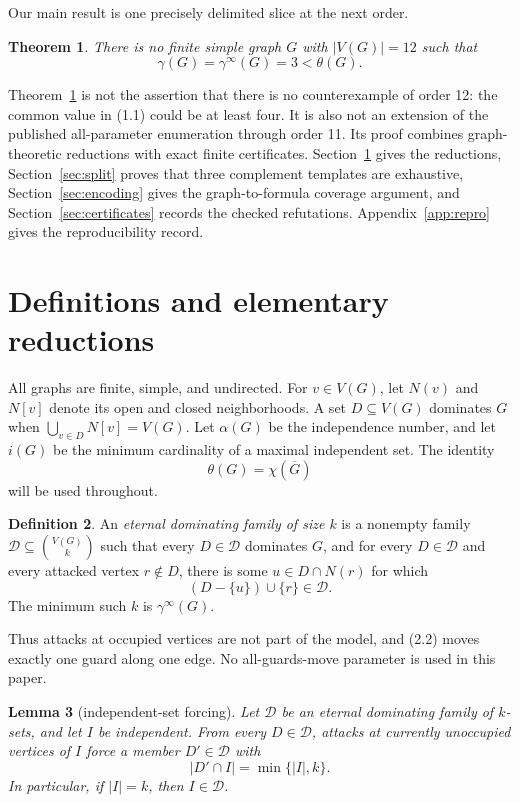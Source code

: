\documentclass[11pt]{article}
\newtheorem{theorem}{Theorem}[section]
\newtheorem{lemma}[theorem]{Lemma}
\theoremstyle{definition}
\newtheorem{definition}[theorem]{Definition}
\theoremstyle{remark}
\newcommand{\gaminf}{\gamma^{\infty}}
\newcommand{\V}{V}
\begin{document}
Our main result is one precisely delimited slice at the next order.

\begin{theorem}\label{thm:main}
There is no finite simple graph \(G\) with \(|\V(G)|=12\) such that
\[
  \gamma(G)=\gaminf(G)=3<\theta(G).
\]
\end{theorem}

Theorem~\ref{thm:main} is not the assertion that there is no counterexample
of order 12: the common value in (1.1) could be at least four.  It is also
not an extension of the published all-parameter enumeration through order
11.  Its proof combines graph-theoretic reductions with exact finite
certificates.  Section~\ref{sec:reductions} gives the reductions,
Section~\ref{sec:split} proves that three complement templates are
exhaustive, Section~\ref{sec:encoding} gives the graph-to-formula coverage
argument, and Section~\ref{sec:certificates} records the checked
refutations.  Appendix~\ref{app:repro} gives the reproducibility record.

\section{Definitions and elementary reductions}\label{sec:reductions}

All graphs are finite, simple, and undirected.  For \(v\in\V(G)\), let
\(N(v)\) and \(N[v]\) denote its open and closed neighborhoods.  A set
\(D\subseteq\V(G)\) dominates \(G\) when
\(\bigcup_{v\in D}N[v]=\V(G)\).  Let \(\alpha(G)\) be the independence
number, and let \(i(G)\) be the minimum cardinality of a maximal independent
set.  The identity
\[
  \theta(G)=\chi(\overline G)
\tag{2.1}
\]
will be used throughout.

\begin{definition}
An \emph{eternal dominating family of size \(k\)} is a nonempty family
\(\mathcal D\subseteq\binom{\V(G)}k\) such that every
\(D\in\mathcal D\) dominates \(G\), and for every \(D\in\mathcal D\) and
every attacked vertex \(r\notin D\), there is some
\(u\in D\cap N(r)\) for which
\[
  (D-\{u\})\cup\{r\}\in\mathcal D.
\tag{2.2}
\]
The minimum such \(k\) is \(\gaminf(G)\).
\end{definition}

Thus attacks at occupied vertices are not part of the model, and (2.2)
moves exactly one guard along one edge.  No all-guards-move parameter is used
in this paper.

\begin{lemma}[independent-set forcing]\label{lem:forcing}
Let \(\mathcal D\) be an eternal dominating family of \(k\)-sets, and let
\(I\) be independent.  From every \(D\in\mathcal D\), attacks at currently
unoccupied vertices of \(I\) force a member \(D'\in\mathcal D\) with
\[
  |D'\cap I|=\min\{|I|,k\}.
\]
In particular, if \(|I|=k\), then \(I\in\mathcal D\).
\end{lemma}
\end{document}
